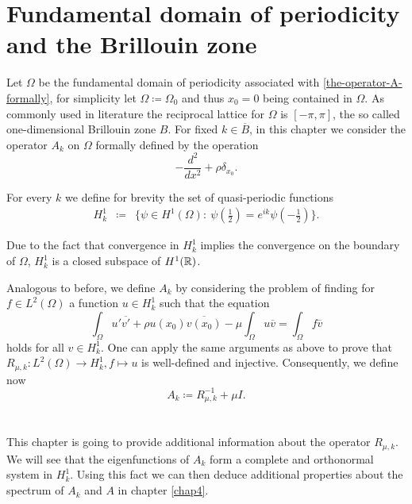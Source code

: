 \chapter{Fundamental domain of periodicity and the Brillouin zone}  \label{chap3}

Let $\Omega$ be the fundamental domain of periodicity associated with \eqref{the-operator-A-formally}, for simplicity let $\Omega \coloneqq \Omega_{0}$ and thus $x_{0} = 0$ being contained in $\Omega$. As commonly used in literature the reciprocal lattice for $\Omega$ is $[-\pi, \pi]$, the so called one-dimensional Brillouin zone $B$. For fixed $k \in \overline{B}$, in this chapter we consider the operator $A_{k}$ on $\Omega$ formally defined by the operation
	\[ -\frac{d^{2}}{dx^{2}} + \rho \delta_{x_{0}}. \]
\begin{definition} For every $k$ we define for brevity the set of quasi-periodic functions  
		\begin{eqnarray}
		H^{1}_{k} & \coloneqq & \Big\{ \psi \in H^{1}(\Omega): ~ \psi(\frac{1}{2}) = e^{ik} \psi(-\frac{1}{2}) \Big\}. \label{quasi-periodic-condition}
	\end{eqnarray}
\end{definition}	
\begin{remark}
Due to the fact that convergence in $H^{1}_{k}$ implies the convergence on the boundary of $\Omega$, $H^{1}_{k}$ is a closed subspace of $H^{1}(\mathbb{R})$.	
\end{remark}
Analogous to before, we define $A_{k}$ by considering the problem of finding for $f \in L^{2}(\Omega)$ a function $u \in H^{1}_{k}$ such that the equation
	\[ \int_{\Omega} u' \overline{v'} + \rho u(x_{0}) \overline{v(x_{0})} - \mu \int_{\Omega} u \overline{v} = \int_{\Omega} f \overline{v} \]
holds for all $v \in H^{1}_{k}$. One can apply the same arguments as above to prove that $R_{\mu, k} \colon L^{2}(\Omega) \rightarrow H^{1}_{k}, f \mapsto u$ is well-defined and injective. Consequently, we define now
	\[ A_{k} \coloneqq R_{\mu, k}^{-1} + \mu I. \] 
~\\ ~\\
This chapter is going to provide additional information about the operator $R_{\mu, k}$. We will see that the eigenfunctions of $A_{k}$ form a complete and orthonormal system in $H^{1}_{k}$. Using this fact we can then deduce additional properties about the spectrum of $A_{k}$ and $A$ in chapter \ref{chap4}.

